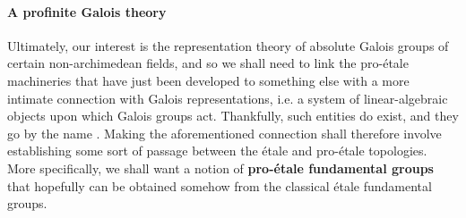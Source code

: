                 \paragraph{A profinite Galois theory}
                    Ultimately, our interest is the representation theory of absolute Galois groups of certain non-archimedean fields, and so we shall need to link the pro-\'etale machineries that have just been developed to something else with a more intimate connection with Galois representations, i.e. a system of linear-algebraic objects upon which Galois groups act. Thankfully, such entities do exist, and they go by the name . Making the aforementioned connection shall therefore involve establishing some sort of passage between the \'etale and pro-\'etale topologies. More specifically, we shall want a notion of \textbf{pro-\'etale fundamental groups} that hopefully can be obtained somehow from the classical \'etale fundamental groups. 
                    
